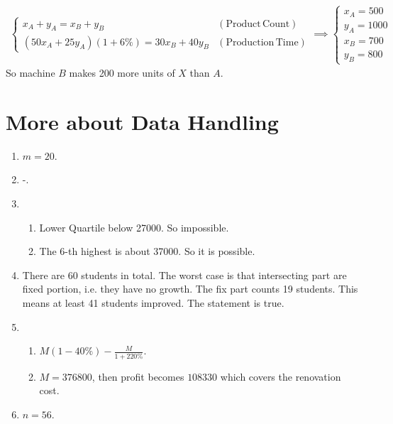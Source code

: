 \documentclass[12pt]{article}
\begin{document}
\begin{enumerate}
\begin{align*}
\begin{cases}
                x_A+y_A = x_B+y_B&(\mathrm{Product\, Count})\\
                (50x_A+25y_A)(1+6\%) = 30x_B+40y_B&(\mathrm{Production\, Time})
            \end{cases}\implies\begin{cases}
                x_A = 500\\
                y_A = 1000\\
                x_B = 700\\
                y_B = 800
            \end{cases}
        \end{align*} So machine $B$ makes 200 more units of $X$ than $A$.
    \end{enumerate}

    \newpage

    \section{More about Data Handling}
    \begin{enumerate}
        \item $m=20$.
        \item -.
        \item \begin{enumerate}
            \item Lower Quartile below 27000. So impossible.
            \item The 6-th highest is about 37000. So it is possible.
        \end{enumerate}
        \item There are 60 students in total. The worst case is that intersecting part are fixed portion, i.e. they have no growth. The fix part counts 19 students. This means at least 41 students improved. The statement is true.
        \item \begin{enumerate}
            \item $M(1-40\%)-\frac{M}{1+220\%}$.
            \item $M=376800$, then profit becomes $108330$ which covers the renovation cost.
        \end{enumerate}
        \item $n=56$.
    \end{enumerate}

    \newpage
\end{document}
